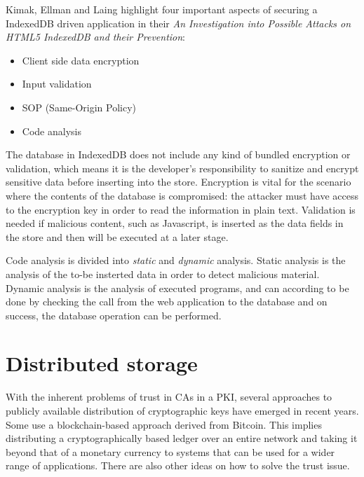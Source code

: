 Kimak, Ellman and Laing highlight four important aspects of securing a IndexedDB driven application in their \emph{An Investigation into Possible Attacks on HTML5 IndexedDB and their Prevention}\cite{IndexedDBSecurity:2012:Online}:

\begin{itemize}
  \item Client side data encryption
  \item Input validation
  \item SOP (Same-Origin Policy)
  \item Code analysis
\end{itemize}

The database in IndexedDB does not include any kind of bundled encryption or validation, which means it is the developer's responsibility to sanitize and encrypt sensitive data before inserting into the store. Encryption is vital for the scenario where the contents of the database is compromised: the attacker must have access to the encryption key in order to read the information in plain text. Validation is needed if malicious content, such as Javascript, is inserted as the data fields in the store and then will be executed at a later stage.

Code analysis is divided into \emph{static} and \emph{dynamic} analysis. Static analysis is the analysis of the to-be insterted data in order to detect malicious material. Dynamic analysis is the analysis of executed programs, and can according to \cite{IndexedDBSecurity:2012:Online} be done by checking the call from the web application to the database and on success, the database operation can be performed.

\section{Distributed storage}
With the inherent problems of trust in CAs in a PKI, several approaches to publicly available distribution of cryptographic keys have emerged in recent years. Some use a blockchain-based approach derived from Bitcoin. This implies distributing a cryptographically based ledger over an entire network and taking it beyond that of a monetary currency to systems that can be used for a wider range of applications. There are also other ideas on how to solve the trust issue.

